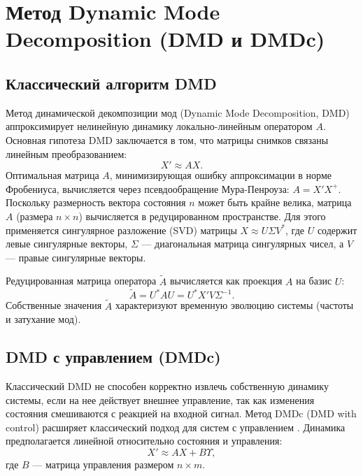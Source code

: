 \section{Метод Dynamic Mode Decomposition (DMD и DMDc)}
\label{sec:dmd}

\subsection{Классический алгоритм DMD}

Метод динамической декомпозиции мод (Dynamic Mode Decomposition, DMD) аппроксимирует нелинейную динамику локально-линейным оператором $A$. Основная гипотеза DMD заключается в том, что матрицы снимков связаны линейным преобразованием:
\begin{equation}
\label{eq:dmd_base}
X' \approx A X.
\end{equation}
Оптимальная матрица $A$, минимизирующая ошибку аппроксимации в норме Фробениуса, вычисляется через псевдообращение Мура-Пенроуза: $A = X' X^+$. Поскольку размерность вектора состояния $n$ может быть крайне велика, матрица $A$ (размера $n \times n$) вычисляется в редуцированном пространстве. Для этого применяется сингулярное разложение (SVD) матрицы $X \approx U \Sigma V^*$, где $U$ содержит левые сингулярные векторы, $\Sigma$ --- диагональная матрица сингулярных чисел, а $V$ --- правые сингулярные векторы. 

Редуцированная матрица оператора $\tilde{A}$ вычисляется как проекция $A$ на базис $U$:
\begin{equation}
\label{eq:dmd_reduced}
\tilde{A} = U^* A U = U^* X' V \Sigma^{-1}.
\end{equation}
Собственные значения $\tilde{A}$ характеризуют временную эволюцию системы (частоты и затухание мод).

\subsection{DMD с управлением (DMDc)}

Классический DMD не способен корректно извлечь собственную динамику системы, если на нее действует внешнее управление, так как изменения состояния смешиваются с реакцией на входной сигнал. Метод DMDc (DMD with control) расширяет классический подход для систем с управлением \cite{proctor2014dynamic}. Динамика предполагается линейной относительно состояния и управления:
\begin{equation}
\label{eq:dmdc_base}
X' \approx A X + B \Upsilon,
\end{equation}
где $B$ --- матрица управления размером $n \times m$. 

